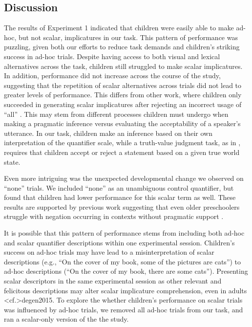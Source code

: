 \documentclass[man]{apa2}
\begin{document}
\subsection{Discussion}

The results of Experiment 1 indicated that children were easily able to make ad-hoc, but not scalar, implicatures in our task. This pattern of performance was puzzling, given both our efforts to reduce task demands and children's striking success in ad-hoc trials. Despite having access to both visual and lexical alternatives across the task, children still struggled to make scalar implicatures. In addition, performance did not increase across the course of the study, suggesting that the repetition of scalar alternatives across trials did not lead to greater levels of performance. This differs from other work, where children only succeeded in generating scalar implicatures after rejecting an incorrect usage of ``all'' . This may stem from different processes children must undergo when making a pragmatic inference versus evaluating the acceptability of a speaker's utterance. In our task, children make an inference based on their own interpretation of the quantifier scale, while a truth-value judgment task, as in , requires that children accept or reject a statement based on a given true world state. 

Even more intriguing was the unexpected developmental change we observed on ``none'' trials. We included ``none'' as an unambiguous control quantifier, but found that children had lower performance for this scalar term as well. These results are supported by previous work suggesting that even older preschoolers struggle with negation occurring in contexts without pragmatic support .

It is possible that this pattern of performance stems from including both ad-hoc and scalar quantifier descriptions within one experimental session. Children's success on ad-hoc trials may have lead to a misinterpretation of  scalar descriptions (e.g., ``On the cover of my book, some of the pictures are cats'') to ad-hoc descriptions (``On the cover of my book, there are some cats''). Presenting scalar descriptors in the same experimental session as other relevant and felicitous descriptions may alter scalar implicature comprehension, even in adults \citeA<cf.>{degen2015}. To explore the whether children's performance on scalar trials was influenced by ad-hoc trials, we removed all ad-hoc trials from our task, and ran a scalar-only version of the the study.
\end{document}
